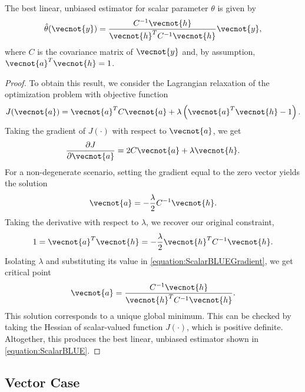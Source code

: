 \begin{proposition} \label{proposition:ScalarBLUE}
The best linear, unbiased estimator for scalar parameter $\theta$ is given by
\begin{equation} \label{equation:ScalarBLUE}
\hat{\theta} (\vecnot{y})
= \frac{C^{-1} \vecnot{h}}{\vecnot{h}^T C^{-1} \vecnot{h}} \vecnot{y} ,
\end{equation}
where $C$ is the covariance matrix of $\vecnot{y}$ and, by assumption, $\vecnot{a}^T \vecnot{h} = 1$.
\end{proposition}
\begin{proof}
To obtain this result, we consider the Lagrangian relaxation of the optimization problem with objective function
\begin{equation*}
J (\vecnot{a}) =
\vecnot{a}^T C \vecnot{a} + \lambda \left( \vecnot{a}^T \vecnot{h} - 1 \right) .
\end{equation*}
Taking the gradient of $J(\cdot)$ with respect to $\vecnot{a}$, we get
\begin{equation*}
\frac{\partial J}{\partial \vecnot{a}} = 2 C \vecnot{a} + \lambda \vecnot{h} .
\end{equation*}
For a non-degenerate scenario, setting the gradient equal to the zero vector yields the solution
\begin{equation} \label{equation:ScalarBLUEGradient}
\vecnot{a} = - \frac{\lambda}{2} C^{-1} \vecnot{h} .
\end{equation}
Taking the derivative with respect to $\lambda$, we recover our original constraint,
\begin{equation*}
1 = \vecnot{a}^T \vecnot{h} = - \frac{\lambda}{2} \vecnot{h}^T C^{-1} \vecnot{h} .
\end{equation*}
Isolating $\lambda$ and substituting its value in \eqref{equation:ScalarBLUEGradient}, we get critical point
\begin{equation}
\vecnot{a} = \frac{C^{-1} \vecnot{h}}{\vecnot{h}^T C^{-1} \vecnot{h}} .
\end{equation}
This solution corresponds to a unique global minimum.
This can be checked by taking the Hessian of scalar-valued function $J(\cdot)$, which is positive definite.
Altogether, this produces the best linear, unbiased estimator shown in \eqref{equation:ScalarBLUE}.
\end{proof}


\subsection{Vector Case}
\label{section:VectorBLUE}

